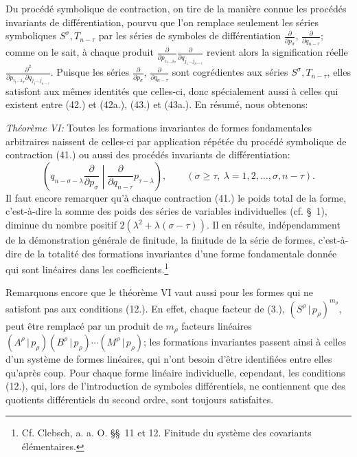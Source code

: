 \documentclass[11pt]{article}
\newcommand{\pair}[2]{(#1\,|\,#2)}
\begin{document}
Du procédé symbolique de contraction, on tire de la manière connue les procédés invariants de différentiation, pourvu que l'on remplace seulement les séries symboliques $S^\sigma,T_{n-\tau}$ par les séries de symboles de différentiation $\frac{\partial}{\partial p_\sigma}$, $\frac{\partial}{\partial q_{n-\tau}}$; comme on le sait, à chaque produit $\frac{\partial}{\partial p_{i_1\ldots i_\sigma}}\frac{\partial}{\partial q_{j_1\ldots j_{n-\tau}}}$ revient alors la signification réelle $\frac{\partial^2}{\partial p_{i_1\ldots i_\sigma}\partial q_{j_1\ldots j_{n-\tau}}}$. Puisque les séries $\frac{\partial}{\partial p_\sigma}$, $\frac{\partial}{\partial q_{n-\tau}}$ sont cogrédientes aux séries $S^\sigma,T_{n-\tau}$, elles satisfont aux mêmes identités que celles-ci, donc spécialement aussi à celles qui existent entre (42.) et (42a.), (43.) et (43a.). En résumé, nous obtenons:

\emph{Théorème VI:} Toutes les formations invariantes de formes fondamentales arbitraires naissent de celles-ci par application répétée du procédé symbolique de contraction (41.) ou aussi des procédés invariants de différentiation:
\begin{equation}
 \left(q_{n-\sigma-\lambda}\frac{\partial}{\partial p_\sigma}\middle|\frac{\partial}{\partial q_{n-\tau}}p_{\tau-\lambda}\right),
 \qquad(\sigma\ge\tau,\ \lambda=1,2,\ldots,\sigma,n-\tau).
\tag{45}
\end{equation}
Il faut encore remarquer qu'à chaque contraction (41.) le poids total de la forme, c'est-à-dire la somme des poids des séries de variables individuelles (cf. \S\ 1), diminue du nombre positif $2(\lambda^2+\lambda(\sigma-\tau))$. Il en résulte, indépendamment de la démonstration générale de finitude, la finitude de la série de formes, c'est-à-dire de la totalité des formations invariantes d'une forme fondamentale donnée qui sont linéaires dans les coefficients.\footnote{Cf. Clebsch, a. a. O. \S\S\ 11 et 12. Finitude du système des covariants élémentaires.}

Remarquons encore que le théorème VI vaut aussi pour les formes qui ne satisfont pas aux conditions (12.). En effet, chaque facteur de (3.), $\pair{S^\rho}{p_\rho}^{m_\rho}$, peut être remplacé par un produit de $m_\rho$ facteurs linéaires $\pair{A^\rho}{p_\rho}\pair{B^\rho}{p_\rho}\cdots\pair{M^\rho}{p_\rho}$; les formations invariantes passent ainsi à celles d'un système de formes linéaires, qui n'ont besoin d'être identifiées entre elles qu'après coup. Pour chaque forme linéaire individuelle, cependant, les conditions (12.), qui, lors de l'introduction de symboles différentiels, ne contiennent que des quotients différentiels du second ordre, sont toujours satisfaites.
\end{document}
